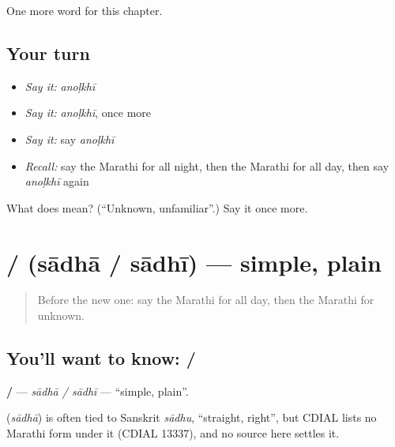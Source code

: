 \begin{grammarlens}[title={What you've built}]
One more word for this chapter.
\end{grammarlens}

\subsection*{Your turn}
\begin{itemize}
\raggedright
  \item \emph{Say it:} \emph{anoḷkhī}
  \item \emph{Say it:} \emph{anoḷkhī}, once more
  \item \emph{Say it:} say \emph{anoḷkhī}
  \item \emph{Recall:} say the Marathi for all night, then the Marathi for all day, then say \emph{anoḷkhī} again
\end{itemize}

\begin{tcolorbox}[breakable,colback=teal!4,colframe=teal!35!black,title={Before you move on}]
What does  mean? (\textquotedblleft{}Unknown, unfamiliar\textquotedblright{}.) Say it once more.
\end{tcolorbox}
\section[\texorpdfstring{\mr{साधा} / \mr{साधी} (sādhā / sādhī)}{साधा / साधी (sādhā / sādhī)}]{ /  (sādhā / sādhī) — simple, plain}

\label{lesson:MR-C259-sadha}



\begin{quote}
Before the new one: say the Marathi for all day, then the Marathi for unknown.
\end{quote}

\subsection*{You'll want to know:  / }
\textbf{ / } — \emph{sādhā / sādhī} — \textquotedblleft{}simple, plain\textquotedblright{}.

\begin{cousinweb}
\textbf{} (\emph{sādhā}) is often tied to Sanskrit \emph{sādhu}, \textquotedblleft{}straight, right\textquotedblright{}, but CDIAL lists no Marathi form under it (CDIAL 13337), and no source here settles it.
\end{cousinweb}

